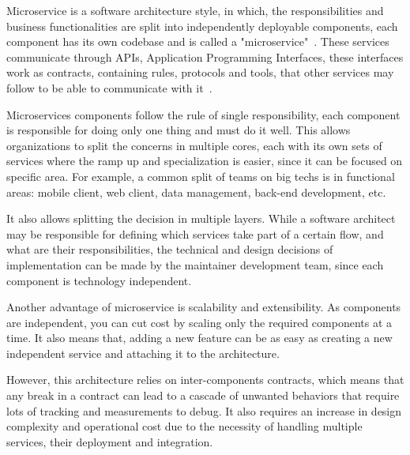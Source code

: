 Microservice is a software architecture style, in which, the responsibilities and business functionalities are split into independently deployable components, each component has its own codebase and is called a "microservice"~\cite{Micro}. These services communicate through APIs, Application Programming Interfaces, these interfaces work as contracts, containing rules, protocols and tools, that other services may follow to be able to communicate with it~\cite{Microservices}.

Microservices components follow the rule of single responsibility, each component is responsible for doing only one thing and must do it well. This allows organizations to split the concerns in multiple cores, each with its own sets of services where the ramp up and specialization is easier, since it can be focused on specific area. For example, a common split of teams on big techs is in functional areas: mobile client, web client, data management, back-end development, etc.

It also allows splitting the decision in multiple layers. While a software architect may be responsible for defining which services take part of a certain flow, and what are their responsibilities, the technical and design decisions of implementation can be made by the maintainer development team, since each component is technology independent.

Another advantage of microservice is scalability and extensibility. As components are independent, you can cut cost by scaling only the required components at a time. It also means that, adding a new feature can be as easy as creating a new independent service and attaching it to the architecture.

However, this architecture relies on inter-components contracts, which means that any break in a contract can lead to a cascade of unwanted behaviors that require lots of tracking and measurements to debug. It also requires an increase in design complexity and operational cost due to the necessity of handling multiple services, their deployment and integration.
